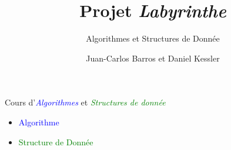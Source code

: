 \documentclass[]{beamer}
\title{Projet \textit{Labyrinthe}}
\subtitle{Algorithmes et Structures de Donnée}
\author{Juan-Carlos Barros et Daniel Kessler}
\begin{document}
\begin{frame}
  \titlepage
\end{frame}

\begin{frame}
  Cours d'\textit{\textcolor<1>{blue}{Algorithmes}}
  et \textit{\textcolor<1>{green}{Structures de donnée}}
  \par\bigskip
  \par
  \begin{minipage}{.5\linewidth}
  \begin{itemize}
  \item<2->\textcolor{blue}{Algorithme}\par{}
  \item<2->\textcolor{green}{Structure de Donnée}\par{}
  \end{itemize}
  \end{minipage}
  \begin{minipage}{.3\linewidth}
  \end{minipage}
\end{frame} %
\end{document}

